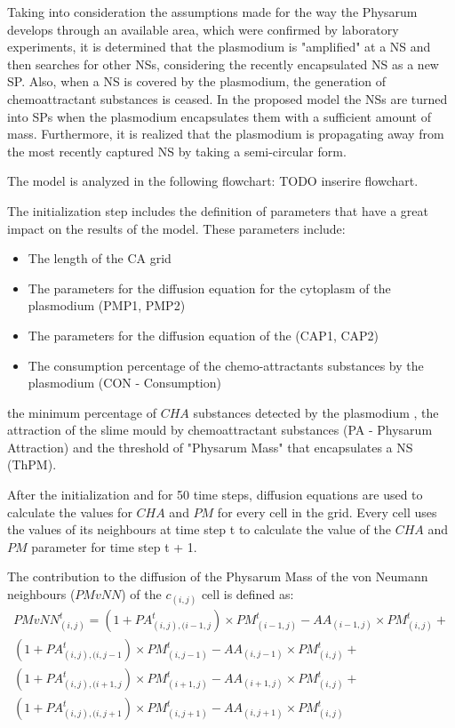 Taking into consideration the assumptions made for the way the Physarum develops through an available area, which were confirmed by laboratory experiments, it is determined that the plasmodium is "amplified" at a NS and then searches for other NSs, considering the recently encapsulated NS as a new SP. Also, when a NS is covered by the plasmodium, the generation of chemoattractant substances is ceased.
In the proposed model the NSs are turned into SPs when the plasmodium encapsulates them with a sufficient amount of mass. Furthermore, it is realized that the plasmodium is propagating away from the most recently captured NS by taking a semi-circular form. 
\par
The model is analyzed in the following flowchart: TODO inserire flowchart.
\par
The initialization step includes the definition of parameters that have a great impact on the results of the model. These parameters include:
\begin{itemize}
	\item The length of the CA grid
	\item The parameters for the diffusion equation for the cytoplasm of the plasmodium (PMP1, PMP2)
	\item The parameters for the diffusion equation of the  (CAP1, CAP2)
	\item The consumption percentage of the chemo-attractants substances by the plasmodium (CON - Consumption)
\end{itemize}
the minimum percentage of $CHA$ substances detected by the plasmodium ,  the attraction of the slime mould by chemoattractant substances (PA - Physarum Attraction) and the threshold of "Physarum Mass" that encapsulates a NS (ThPM).
\par
After the initialization and for 50 time steps, diffusion equations are used to calculate the values for $CHA$ and $PM$ for every cell in the grid. Every cell uses the values of its neighbours at time step t to calculate the value of the $CHA$ and $PM$ parameter for time step t + 1. 
\par
The contribution to the diffusion of the Physarum Mass of the von Neumann neighbours ($PMvNN$) of the $c_{(i,j)}$ cell is defined as:
\begin{equation}
\begin{split}
PMvNN^t_{(i, j)} = 
(1 + PA^t_{(i, j),(i-1, j}) \times PM^t_{(i-1, j)} - AA_{(i-1, j)} \times PM^t_{(i, j)} +
\\(1 + PA^t_{(i, j),(i, j-1}) \times PM^t_{(i, j-1)} - AA_{(i, j-1)} \times PM^t_{(i, j)} +
\\(1 + PA^t_{(i, j),(i+1, j}) \times PM^t_{(i+1, j)} - AA_{(i+1, j)} \times PM^t_{(i, j)}  +
\\(1 + PA^t_{(i, j),(i, j+1}) \times PM^t_{(i, j+1)} - AA_{(i, j+1)} \times PM^t_{(i, j)}
\end{split}
\end{equation}
